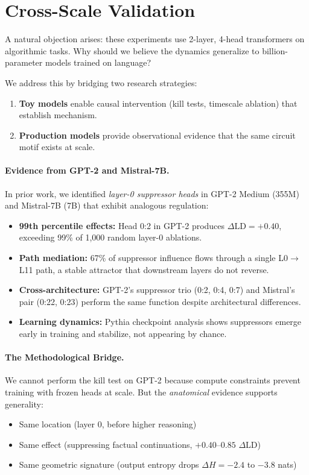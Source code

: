 \section{Cross-Scale Validation}\label{sec:scale}

A natural objection arises: these experiments use 2-layer, 4-head transformers on algorithmic tasks. Why should we believe the dynamics generalize to billion-parameter models trained on language?

We address this by bridging two research strategies:
\begin{enumerate}
    \item \textbf{Toy models} enable causal intervention (kill tests, timescale ablation) that establish mechanism.
    \item \textbf{Production models} provide observational evidence that the same circuit motif exists at scale.
\end{enumerate}

\paragraph{Evidence from GPT-2 and Mistral-7B.}
In prior work, we identified \emph{layer-0 suppressor heads} in GPT-2 Medium (355M) and Mistral-7B (7B) that exhibit analogous regulation:
\begin{itemize}
    \item \textbf{99th percentile effects:} Head 0:2 in GPT-2 produces $\Delta\text{LD} = +0.40$, exceeding 99\% of 1,000 random layer-0 ablations.
    \item \textbf{Path mediation:} 67\% of suppressor influence flows through a single L0$\to$L11 path, a stable attractor that downstream layers do not reverse.
    \item \textbf{Cross-architecture:} GPT-2's suppressor trio (0:2, 0:4, 0:7) and Mistral's pair (0:22, 0:23) perform the same function despite architectural differences.
    \item \textbf{Learning dynamics:} Pythia checkpoint analysis shows suppressors emerge early in training and stabilize, not appearing by chance.
\end{itemize}

\paragraph{The Methodological Bridge.}
We cannot perform the kill test on GPT-2 because compute constraints prevent training with frozen heads at scale. But the \emph{anatomical} evidence supports generality:
\begin{itemize}
    \item Same location (layer 0, before higher reasoning)
    \item Same effect (suppressing factual continuations, $+0.40$--$0.85$ $\Delta$LD)
    \item Same geometric signature (output entropy drops $\Delta H = -2.4$ to $-3.8$ nats)
\end{itemize}

